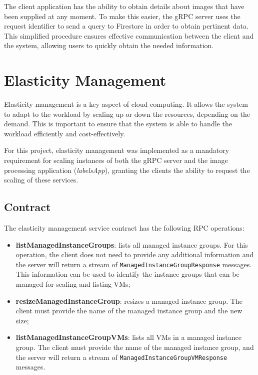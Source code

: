 The client application has the ability to obtain details about images that have been supplied at any moment. To make this easier, the gRPC server uses the request identifier to send a query to Firestore in order to obtain pertinent data. This simplified procedure ensures effective communication between the client and the system, allowing users to quickly obtain the needed information.



\section{Elasticity Management}\label{sec:elasticity_management}

Elasticity management is a key aspect of cloud computing.
It allows the system to adapt to the workload by scaling up or down the resources, depending on the demand.
This is important to ensure that the system is able to handle the workload efficiently and cost-effectively.

For this project,
elasticity management was implemented as a mandatory requirement for scaling instances of both the gRPC server and the image processing application
(\textit{labelsApp}), granting the clients the ability to request the scaling of these services.

\subsection{Contract}\label{subsec:elasticity-management-contract}

The elasticity management service contract has the following RPC operations:

\begin{itemize}
    \item \textbf{listManagedInstanceGroups}: lists all managed instance groups.
    For this operation,
    the client does not need to provide any additional information
    and the server will return a stream of \texttt{ManagedInstanceGroupResponse} messages.
    This information can be used to identify the instance groups that can be managed for scaling and listing VMs;
    \item \textbf{resizeManagedInstanceGroup}: resizes a managed instance group.
    The client must provide the name of the managed instance group and the new size;
    \item \textbf{listManagedInstanceGroupVMs}: lists all VMs in a managed instance group.
    The client must provide the name of the managed instance group, and the server will return a stream of \texttt{ManagedInstanceGroupVMResponse} messages.
\end{itemize}

